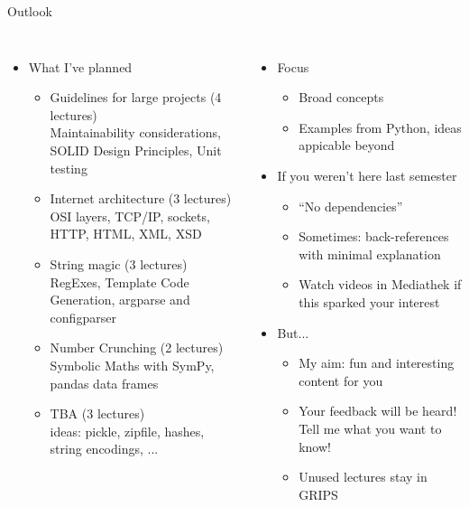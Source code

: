 \begin{frame}{Outlook}
%
\begin{columns}[T]
\begin{itemize}
\item What I've planned
	\begin{itemize}
	\footnotesize
	\item Guidelines for large projects (4 lectures) \\
		Maintainability considerations, SOLID Design Principles, Unit testing
	\item Internet architecture (3 lectures) \\
		OSI layers, TCP/IP, sockets, HTTP, HTML, XML, XSD
	\item String magic (3 lectures) \\
		RegExes, Template Code Generation, argparse and configparser
	\item Number Crunching (2 lectures) \\
		Symbolic Maths with SymPy, pandas data frames
	\item TBA (3 lectures) \\
		ideas: pickle, zipfile, hashes, string encodings, ...
	\end{itemize}
\end{itemize}
%
\begin{itemize}
\item Focus
	\begin{itemize}
	\footnotesize
	\item Broad concepts
	\item Examples from Python, ideas appicable beyond
	\end{itemize}
\item If you weren't here last semester
	\begin{itemize}
	\footnotesize
	\item \enquote{No dependencies}
	\item Sometimes: back-references with minimal explanation
	\item Watch videos in Mediathek if this sparked your interest
	\end{itemize}
\item But...
	\begin{itemize}
	\footnotesize
	\item My aim: fun and interesting content for you
	\item Your feedback will be heard! Tell me what you want to know!
	\item Unused lectures stay in GRIPS
	\end{itemize}
\end{itemize}
\end{columns}
%
\end{frame}

